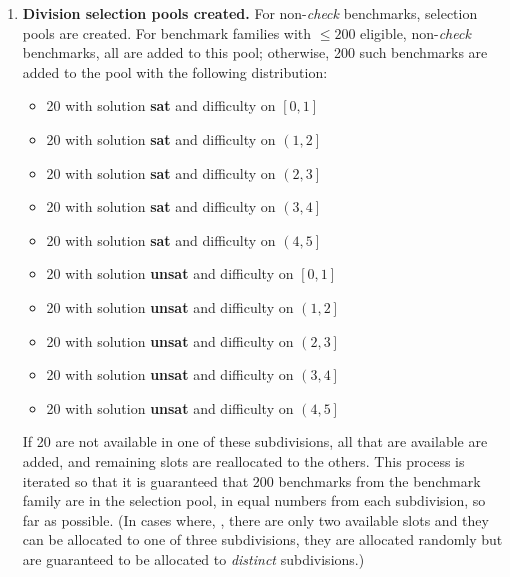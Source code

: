 \documentclass[12pt]{article}
\begin{document}
\begin{enumerate}
\item\label{step:pool} \textbf{Division selection pools created.} %
  For non-\emph{check} benchmarks, selection pools are created.
  For benchmark families with $\leq200$ eligible,
  non-\emph{check} benchmarks, all are added to this pool;
  otherwise, 200 such benchmarks are added to the pool with the
  following distribution:
%
  \begin{itemize}
  \item 20 with solution \textbf{sat} and difficulty on $\left[0,1\right]$
  \item 20 with solution \textbf{sat} and difficulty on $\left(1,2\right]$
  \item 20 with solution \textbf{sat} and difficulty on $\left(2,3\right]$
  \item 20 with solution \textbf{sat} and difficulty on $\left(3,4\right]$
  \item 20 with solution \textbf{sat} and difficulty on $\left(4,5\right]$
  \item 20 with solution \textbf{unsat} and difficulty on $\left[0,1\right]$
  \item 20 with solution \textbf{unsat} and difficulty on $\left(1,2\right]$
  \item 20 with solution \textbf{unsat} and difficulty on $\left(2,3\right]$
  \item 20 with solution \textbf{unsat} and difficulty on $\left(3,4\right]$
  \item 20 with solution \textbf{unsat} and difficulty on $\left(4,5\right]$
  \end{itemize}
%
  If 20 are not available in one of these subdivisions, all that are
  available are added, and remaining slots are reallocated to the
  others.  This process is iterated so that it is guaranteed that 200
  benchmarks from the benchmark family are in the selection pool, in
  equal numbers from each subdivision, so far as possible.
  (In cases where, \eg, there are only two available slots and
  they can be allocated to one of three subdivisions, they are allocated
  randomly but are guaranteed to be allocated to \emph{distinct}
  subdivisions.)


\end{enumerate}
\end{document}

